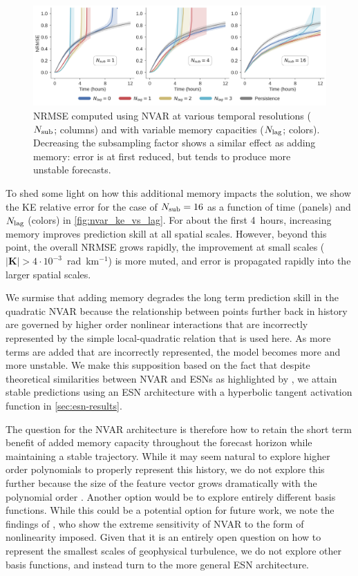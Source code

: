 \documentclass[draft]{agujournal2019}
\newcommand{\citep}{\cite}
\newcommand{\citet}{\citeA}
\begin{document}
\begin{figure}
    \centering
    \includegraphics[width=\textwidth]{figures/nvar_nrmse_vs_memory.jpg}
    \caption{NRMSE computed using NVAR at various temporal resolutions
        ($N_\text{sub}$; columns) and with variable memory capacities ($N_\text{lag}$;
        colors).
        Decreasing the subsampling factor shows a similar effect as adding
        memory: error is at first reduced, but tends to produce more unstable
        forecasts.
    }
    \label{fig:nvar_nrmse_vs_lag}
\end{figure}

To shed some light on how this additional memory impacts the solution,
we show the KE relative error
for the case of $N_\text{sub}=16$ as a function of time (panels) and $N_\text{lag}$ (colors)
in \cref{fig:nvar_ke_vs_lag}.
For about the first 4~hours, increasing memory improves prediction skill at all
spatial scales.
However, beyond this point, the overall NRMSE grows rapidly, the improvement
at small scales ($|\mathbf{K}|>4\cdot10^{-3}$~rad~km$^{-1}$) is more muted,
and error is propagated rapidly into the larger spatial scales.

We surmise that adding memory degrades the long term prediction skill in the
quadratic NVAR because
the relationship between points further back in history are governed by higher
order nonlinear interactions that are incorrectly represented by
the simple local-quadratic relation that is used here.
As more terms are added that are incorrectly represented, the model becomes
more and more unstable.
We make this supposition based on the fact that despite
theoretical similarities between NVAR and
ESNs as highlighted by \citet{bollt_explaining_2021}, we attain stable
predictions using an ESN architecture with a hyperbolic tangent activation
function in \cref{sec:esn-results}.

The question for the NVAR architecture
is therefore how to retain the short term benefit of added memory
capacity throughout the forecast horizon while maintaining a stable trajectory.
While it may seem natural to explore higher order polynomials to
properly represent this history, we do not explore this further because the size
of the feature vector grows dramatically with the polynomial order
\citep{chen_next_2022}.
Another option would be to explore entirely different basis functions.
While this could be a potential option for future work, we note the findings of
\citet{zhang_catch-22_2022}, who show the extreme sensitivity of NVAR to the
form of nonlinearity imposed.
Given that it is an entirely open question on how to represent the smallest
scales of geophysical turbulence, we do not explore other basis functions, and
instead turn to the more general ESN architecture.
\end{document}
